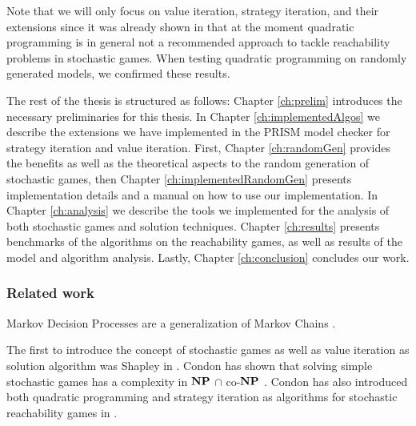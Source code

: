 Note that we will only focus on value iteration, strategy iteration, and their extensions since it was already shown in \cite{gandalf} that at the moment
quadratic programming is in general not a recommended approach to tackle reachability problems in stochastic games.
When testing quadratic programming on randomly generated models, we confirmed these results.


The rest of the thesis is structured as follows:
Chapter \ref{ch:prelim} introduces the necessary preliminaries for this thesis.
In Chapter \ref{ch:implementedAlgos} we describe the extensions we have implemented in the PRISM model checker for strategy iteration and value iteration.
First, Chapter \ref{ch:randomGen} provides the benefits as well as the theoretical aspects to the random generation of stochastic games,
then Chapter \ref{ch:implementedRandomGen} presents implementation details and a manual on how to use our implementation.
In Chapter \ref{ch:analysis} we describe the tools we implemented for the analysis of both stochastic games and solution techniques.
Chapter \ref{ch:results} presents benchmarks of the algorithms on the reachability games, as well as results of the model and algorithm analysis.
Lastly, Chapter \ref{ch:conclusion} concludes our work.

\subsubsection*{Related work}
Markov Decision Processes are a generalization of Markov Chains \cite{Puterman} \cite[Ch.~11]{introProb}.

The first to introduce the concept of stochastic games as well as value iteration as solution algorithm was Shapley in \cite{shapley}.
Condon has shown that solving simple stochastic games has a complexity in $\mathbf{NP}$ $\cap$ co-$\mathbf{NP}$ \cite{condonComplexity}.
Condon has also introduced both quadratic programming and strategy iteration as algorithms for stochastic reachability games in \cite{condonQP}. 

